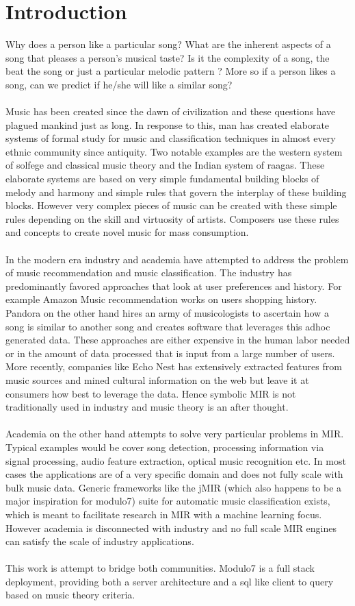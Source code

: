 \chapter{Introduction}
\label{sec:intro}

Why does a person like a particular song? What are the inherent aspects of a song that pleases a person's musical taste? Is it the complexity of a song, the beat the song or just a particular melodic pattern ? More so if a person likes a song, can we predict if he/she will like a similar song? \\\\
Music has been created since the dawn of civilization and these questions have plagued mankind just as long. In response to this, man has created elaborate systems of formal study for music and classification techniques in almost every ethnic community since antiquity. Two notable examples are the western system of solfege and classical music theory and the Indian system of raagas. These elaborate systems are based on very simple fundamental building blocks of melody and harmony and simple rules that govern the interplay of these building blocks. However very complex pieces of music can be created with these simple rules depending on the skill and virtuosity of artists. Composers use these rules and concepts to create novel music for mass consumption. \\\\
In the modern era industry and academia have attempted to address the problem of music recommendation and music classification. The industry has predominantly favored approaches that look at user preferences and history. For example Amazon Music recommendation works on users shopping history. Pandora on the other hand hires an army of musicologists to ascertain how a song is similar to another song and creates software that leverages this adhoc generated data. These approaches are either expensive in the human labor needed or in the amount of data processed that is input from a large number of users. More recently, companies like Echo Nest has extensively extracted features from music sources and mined cultural information on the web but leave it at consumers how best to leverage the data. Hence symbolic MIR is not traditionally used in industry and music theory is an after thought. \\\\
Academia on the other hand attempts to solve very particular problems in MIR. Typical examples would be cover song detection, processing information via signal processing, audio feature extraction, optical music recognition etc. In most cases the applications are of a very specific domain and does not fully scale with bulk music data. Generic frameworks like the jMIR (which also happens to be a major inspiration for modulo7) suite for automatic music classification exists, which is meant to facilitate research in MIR with a machine learning focus. However academia is disconnected with industry and no full scale MIR engines can satisfy the scale of industry applications. \\\\
This work is attempt to bridge both communities. Modulo7 is a full stack deployment, providing both a server architecture and a sql like client to query based on music theory criteria.
